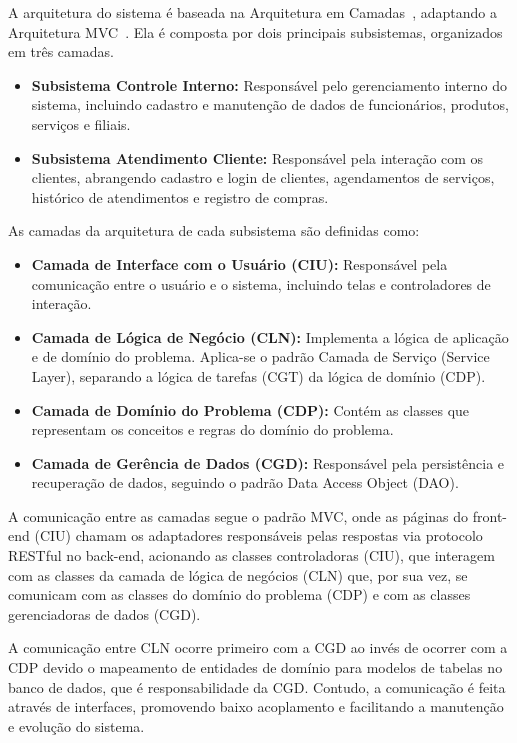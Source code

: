 A arquitetura do sistema \emph{\imprimirtitulo} é baseada na Arquitetura em Camadas~\cite{tu2023layered}, adaptando a Arquitetura MVC~\cite{qureshi2014mvc}. Ela é composta por dois principais subsistemas, organizados em três camadas.
\begin{itemize}
	\item \textbf{Subsistema Controle Interno:} Responsável pelo gerenciamento interno do sistema, incluindo cadastro e manutenção de dados de funcionários, produtos, serviços e filiais.
	\item \textbf{Subsistema Atendimento Cliente:} Responsável pela interação com os clientes, abrangendo cadastro e login de clientes, agendamentos de serviços, histórico de atendimentos e registro de compras.
\end{itemize}
As camadas da arquitetura de cada subsistema são definidas como:
\begin{itemize}
	\item \textbf{Camada de Interface com o Usuário (CIU):} Responsável pela comunicação entre o usuário e o sistema, incluindo telas e controladores de interação.
	\item \textbf{Camada de Lógica de Negócio (CLN):} Implementa a lógica de aplicação e de domínio do problema. Aplica-se o padrão Camada de Serviço (Service Layer), separando a lógica de tarefas (CGT) da lógica de domínio (CDP).
	\item \textbf{Camada de Domínio do Problema (CDP):} Contém as classes que representam os conceitos e regras do domínio do problema.
	\item \textbf{Camada de Gerência de Dados (CGD):} Responsável pela persistência e recuperação de dados, seguindo o padrão Data Access Object (DAO).
\end{itemize}
A comunicação entre as camadas segue o padrão MVC, onde as páginas do front-end (CIU) chamam os adaptadores responsáveis pelas respostas via protocolo RESTful no back-end, acionando as classes controladoras (CIU), que interagem com as classes da camada de lógica de negócios (CLN) que, por sua vez, se comunicam com as classes do domínio do problema (CDP) e com as classes gerenciadoras de dados (CGD).

A comunicação entre CLN ocorre primeiro com a CGD ao invés de ocorrer com a CDP devido o mapeamento de entidades de domínio para modelos de tabelas no banco de dados, que é responsabilidade da CGD.
Contudo, a comunicação é feita através de interfaces, promovendo baixo acoplamento e facilitando a manutenção e evolução do sistema.

\vspace{0.5cm}

